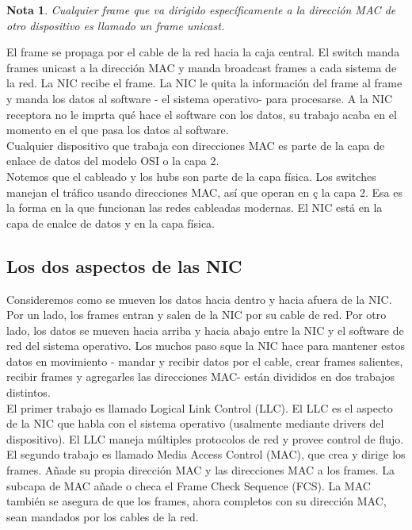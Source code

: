 \documentclass[12pt]{report}
\newtheorem{nota}{Nota}
\begin{document}
\begin{nota}
Cualquier frame que va dirigido específicamente a la dirección 
MAC de otro dispositivo es llamado un frame unicast.
\end{nota}
El frame se propaga por el cable de la red hacia la caja central. 
El switch manda frames unicast a la dirección MAC y manda broadcast frames
a cada sistema de la red. La NIC recibe el frame. La NIC le quita la información 
del frame al frame y manda los datos al software - el sistema operativo- para procesarse.
A la NIC receptora no le imprta qué hace el software con los datos, su 
trabajo acaba en el momento en el que pasa los datos al software.\\
Cualquier dispositivo que trabaja con direcciones MAC es parte 
de la capa de enlace de datos del modelo OSI o la capa 2.\\
Notemos que el cableado y los hubs son parte de la capa física. 
Los switches manejan el tráfico usando direcciones MAC, así que operan en ç
la capa 2. Esa es la forma en la que funcionan las redes cableadas modernas.
El NIC está en la capa de enalce de datos y en la capa física.

\subsection{Los dos aspectos de las NIC}
Consideremos como se mueven los datos hacia dentro y hacia afuera de la NIC.
Por un lado, los frames entran y salen de la NIC por su cable de red. 
Por otro lado, los datos se mueven hacia arriba y hacia abajo entre la NIC
y el software de red del sistema operativo. Los muchos paso sque la NIC 
hace para mantener estos datos en movimiento - mandar y recibir datos por el cable,
crear frames salientes, recibir frames y agregarles las direcciones MAC- están 
divididos en dos trabajos distintos.\\
El primer trabajo es llamado Logical Link Control (LLC). 
El LLC es el aspecto de la NIC que habla con el sistema operativo (usalmente mediante drivers
del dispositivo). El LLC maneja múltiples protocolos de red y provee control de flujo.\\
El segundo trabajo es llamado Media Access Control (MAC), que 
crea y dirige los frames. Añade su propia dirección MAC y las direcciones MAC 
a los frames. La subcapa de MAC añade o checa el Frame Check Sequence (FCS).
La MAC también se asegura de que los frames, ahora completos con su dirección MAC,
sean mandados por los cables de la red.
\end{document}
